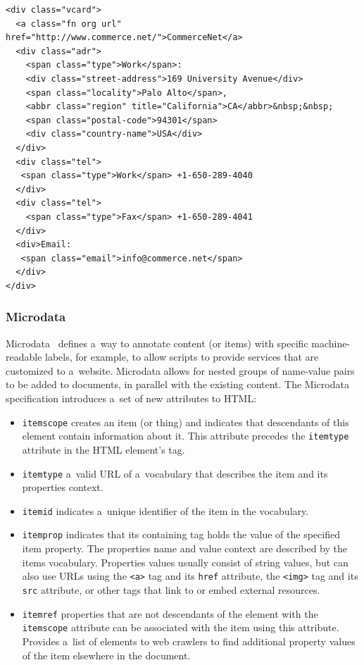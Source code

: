 \begin{lstlisting}[caption={
   [Sample code snippet with embedded hCard Microformat mark-up.]
   {Sample code snippet with embedded \texttt{hCard} Microformat
    mark-up. Source: \url{http://microformats.org/wiki/hcard}.}
  },
  label={code:microformats}]
<div class="vcard">
  <a class="fn org url" href="http://www.commerce.net/">CommerceNet</a>
  <div class="adr">
    <span class="type">Work</span>:
    <div class="street-address">169 University Avenue</div>
    <span class="locality">Palo Alto</span>,  
    <abbr class="region" title="California">CA</abbr>&nbsp;&nbsp;
    <span class="postal-code">94301</span>
    <div class="country-name">USA</div>
  </div>
  <div class="tel">
   <span class="type">Work</span> +1-650-289-4040
  </div>
  <div class="tel">
    <span class="type">Fax</span> +1-650-289-4041
  </div>
  <div>Email: 
   <span class="email">info@commerce.net</span>
  </div>
</div>
\end{lstlisting}

\subsubsection{Microdata}

Microdata~\cite{hickson2012microdata} defines a~way to annotate 
content (or items) with specific machine-readable labels,
for example, to allow scripts to provide services that are
customized to a~website.
Microdata allows for nested groups of name-value pairs
to be added to documents,
in parallel with the existing content.
The Microdata specification introduces
a~set of new attributes to HTML:

\begin{itemize}
  \item \texttt{itemscope} creates an item (or thing) and
        indicates that descendants of this element contain
        information about it. This attribute precedes the
        \texttt{itemtype} attribute in the HTML element's tag.
  \item \texttt{itemtype} a~valid URL of a~vocabulary that
        describes the item and its properties context.
  \item \texttt{itemid} indicates a~unique identifier
        of the item in the vocabulary.
  \item \texttt{itemprop} indicates that its containing tag
        holds the value of the specified item property.
        The properties name and value context are described by
        the items vocabulary. Properties values usually
        consist of string values,
        but can also use URLs using the \texttt{<a>} tag
        and its \texttt{href} attribute,
        the \texttt{<img>} tag and its \texttt{src} attribute,
        or other tags that link to or embed external resources.
  \item \texttt{itemref} properties that are not descendants of
        the element with the \texttt{itemscope} attribute
        can be associated with the item using this attribute.
        Provides a~list of elements to web crawlers to find
        additional property values of the item
        elsewhere in the document.
\end{itemize}

